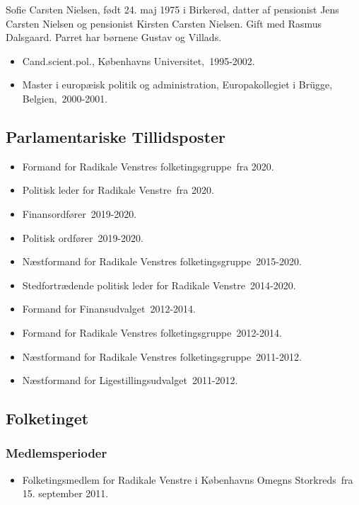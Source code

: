 \documentclass[11pt, a4paper]{awesome-cv}
\begin{document}
\makecvheader[R]
\makelettertitle
\begin{cvletter}
Sofie Carsten Nielsen, født 24. maj 1975 i Birkerød, datter af pensionist Jens Carsten Nielsen og pensionist Kirsten Carsten Nielsen. Gift med Rasmus Dalsgaard. Parret har børnene Gustav og Villads.

\begin{itemize}
\item Cand.scient.pol., Københavns Universitet, 1995-2002.
\item Master i europæisk politik og administration, Europakollegiet i Brügge, Belgien, 2000-2001.
\end{itemize}
\subsection*{Parlamentariske Tillidsposter}
\begin{itemize}
\item Formand for Radikale Venstres folketingsgruppe fra 2020.
\item Politisk leder for Radikale Venstre fra 2020.
\item Finansordfører 2019-2020.
\item Politisk ordfører 2019-2020.
\item Næstformand for Radikale Venstres folketingsgruppe 2015-2020.
\item Stedfortrædende politisk leder for Radikale Venstre 2014-2020.
\item Formand for Finansudvalget 2012-2014.
\item Formand for Radikale Venstres folketingsgruppe 2012-2014.
\item Næstformand for Radikale Venstres folketingsgruppe 2011-2012.
\item Næstformand for Ligestillingsudvalget 2011-2012.
\end{itemize}
\subsection*{Folketinget}
\subsubsection*{Medlemsperioder}
\begin{itemize}
\item Folketingsmedlem for Radikale Venstre i Københavns Omegns Storkreds fra 15. september 2011.
\end{itemize}

\end{cvletter}
\end{document}
